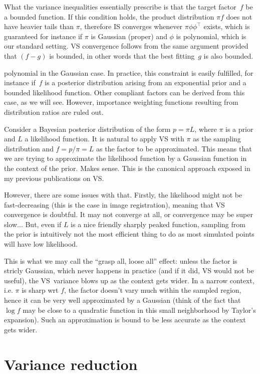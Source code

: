 \documentclass{article}
\begin{document}
What the variance inequalities essentially prescribe is that the target factor~$f$ be a bounded function. If this condition holds, the product distribution $\pi f$ does not have heavier tails than $\pi$, therefore IS converges whenever $\pi \phi\phi^\top$ exists, which is guaranteed for instance if $\pi$ is Gaussian (proper) and  $\phi$ is polynomial, which is our standard setting. VS convergence follows from the same argument provided that $(f-g)$ is bounded, in other words that the best fitting~$g$ is also bounded. 

polynomial in the Gaussian case. In practice, this constraint is easily fulfilled, for instance if~$f$ is a posterior distribution arising from an exponential prior and a bounded likelihood function. Other compliant factors can be derived from this case, as we will see. However, importance weighting functions resulting from distribution ratios are ruled out.

Consider a Bayesian posterior distribution of the form $p=\pi L$, where $\pi$ is a prior and $L$ a likelihood function. It is natural to apply VS with $\pi$ as the sampling distribution and $f=p/\pi=L$ as the factor to be approximated. This means that we are trying to approximate the likelihood function by a Gaussian function in the context of the prior. Makes sense. This is the canonical approach exposed in my previous publications on VS.

However, there are some issues with that. Firstly, the likelihood might not be fast-decreasing (this is the case in image registration), meaning that VS convergence is doubtful. It may not converge at all, or convergence may be super slow... But, even if $L$ is a nice friendly sharply peaked function, sampling from the prior is intuitively not the most efficient thing to do as most simulated points will have low likelihood.

This is what we may call the ``grasp all, loose all'' effect: unless the factor is stricly Gaussian, which never happens in practice (and if it did, VS would not be useful), the VS~variance blows up as the context gets wider. In a narrow context, i.e. $\pi$ is sharp wrt $f$, the factor doesn't vary much within the sampled region, hence it can be very well approximated by a Gaussian (think of the fact that $\log f$ may be close to a quadratic function in this small neighborhood by Taylor's expansion). Such an approximation is bound to be less accurate as the context gets wider. 


\section{Variance reduction}
\end{document}
